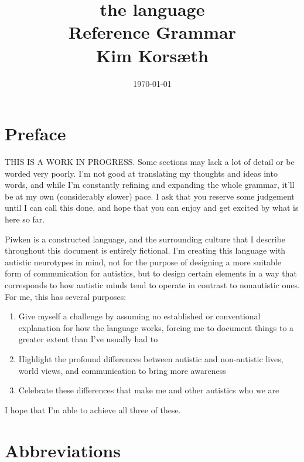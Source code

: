 \documentclass[smallroyalvopaper,9pt]{memoir}
\title{
    \fontsize{70}{60}\selectfont 
    {the \langeng{} language} \\
    \sffamily 
    \vspace{2cm}
    \fontsize{30}{32}\selectfont 
    Reference Grammar\\
    \vspace{2cm}
    Kim Korsæth
}
\author{}
\date{\today}
\newcommand{\langeng}{Piwken}
\begin{document}
\maketitle

\newpage

\frontmatter

\chapter*{Preface}

THIS IS A WORK IN PROGRESS. Some sections may lack a lot of detail or be worded very poorly. I'm not good at translating my thoughts and ideas into words, and while I'm constantly refining and expanding the whole grammar, it'll be at my own (considerably slower) pace. I ask that you reserve some judgement until I can call this done, and hope that you can enjoy and get excited by what is here so far.

\langeng{} is a constructed language, and the surrounding culture that I describe throughout this document is entirely fictional. I'm creating this language with autistic neurotypes in mind, not for the purpose of designing a more suitable form of communication for autistics, but to design certain elements in a way that corresponds to how autistic minds tend to operate in contrast to nonautistic ones. For me, this has several purposes: 

\begin{enumerate}
    \item Give myself a challenge by assuming no established or conventional explanation for how the language works, forcing me to document things to a greater extent than I've usually had to
    \item Highlight the profound differences between autistic and non-autistic lives, world views, and communication to bring more awareness
    \item Celebrate these differences that make me and other autistics who we are
\end{enumerate}

I hope that I'm able to achieve all three of these. 

\newpage
\tableofcontents
\listoffigures
\listoftables
\newpage

\chapter{Abbreviations}
\end{document}
